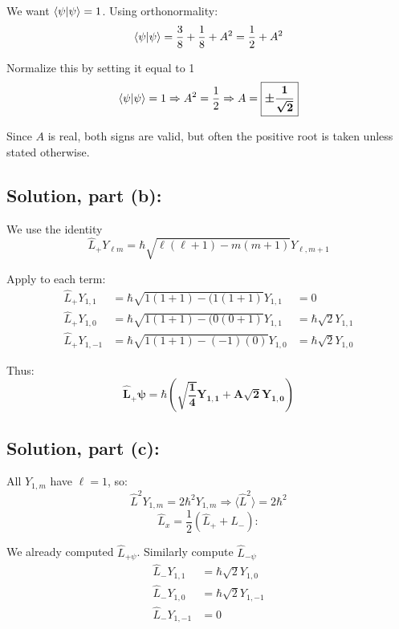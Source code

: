\documentclass[12pt]{article}
\begin{document}
        We want $\braket{\psi}{\psi} = 1$. Using orthonormality:
        \[
        \braket{\psi}{\psi} = \frac{3}{8} + \frac{1}{8} + A^2 = \frac{1}{2} + A^2
        \]

        Normalize this by setting it equal to 1
        \[
            \braket{\psi}{\psi} = 1 \Rightarrow A^2 = \frac{1}{2} \Rightarrow A = \boldsymbol{\boxed{\pm \frac{1}{\sqrt{2}}}}
        \]

        Since $A$ is real, both signs are valid, but often the positive root is taken unless stated otherwise.

    \subsection{Solution, part (b):}
        We use the identity
        \[
            \hat{L}_+ Y_{\ell m} = \hbar \sqrt{\ell(\ell+1) - m(m+1)} Y_{\ell, m+1}
        \]

        Apply to each term:
        \begin{align*}
            \hat{L}_+ Y_{1,1} &= \hbar \sqrt{1(1+1) - (1(1+1)} Y_{1,1} &= 0 \\
            \hat{L}_+ Y_{1,0} &= \hbar \sqrt{1(1+1) - (0(0+1)} Y_{1,1} &= \hbar \sqrt{2} Y_{1,1} \\
            \hat{L}_+ Y_{1,-1} &= \hbar \sqrt{1(1+1) - (-1)(0)} Y_{1,0} &= \hbar \sqrt{2} Y_{1,0}
        \end{align*}

        Thus:
        \[
            \boldsymbol{\boxed{\hat{L}_+ \psi = \hbar \left( \sqrt{\frac{1}{4}} Y_{1,1} + A \sqrt{2} Y_{1,0} \right)}}
        \]

    \subsection{Solution, part (c):}
        All $Y_{1,m}$ have $\ell=1$, so:
        \[
            \hat{L}^2 Y_{1,m} = 2\hbar^2 Y_{1,m} \Rightarrow \langle \hat{L}^2 \rangle = 2\hbar^2
        \]
        \[
            \hat{L}_x = \frac{1}{2}(\hat{L}_+ + \hat{L}_-):
        \]

        We already computed $\hat{L}_{+\psi}$. Similarly compute $\hat{L}_{-\psi}$
        \begin{align*}
        \hat{L}_- Y_{1,1} &= \hbar \sqrt{2} Y_{1,0} \\
        \hat{L}_- Y_{1,0} &= \hbar \sqrt{2} Y_{1,-1} \\
        \hat{L}_- Y_{1,-1} &= 0
        \end{align*}
\end{document}
